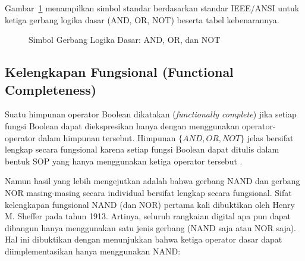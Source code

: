 Gambar~\ref{fig:gerbang-dasar} menampilkan simbol standar berdasarkan standar IEEE/ANSI untuk ketiga gerbang logika dasar (AND, OR, NOT) beserta tabel kebenarannya.

\begin{figure}[htbp]
\centering
{}
\caption{Simbol Gerbang Logika Dasar: AND, OR, dan NOT}
\label{fig:gerbang-dasar}
\end{figure}

\subsection{Kelengkapan Fungsional (Functional Completeness)}

Suatu himpunan operator Boolean dikatakan  (\textit{functionally complete}) jika setiap fungsi Boolean dapat diekspresikan hanya dengan menggunakan operator-operator dalam himpunan tersebut. Himpunan $\{AND, OR, NOT\}$ jelas bersifat lengkap secara fungsional karena setiap fungsi Boolean dapat ditulis dalam bentuk SOP yang hanya menggunakan ketiga operator tersebut \cite{rosen2019}.

Namun hasil yang lebih mengejutkan adalah bahwa gerbang NAND dan gerbang NOR masing-masing secara individual bersifat lengkap secara fungsional. Sifat kelengkapan fungsional NAND (dan NOR) pertama kali dibuktikan oleh Henry M. Sheffer pada tahun 1913. Artinya, seluruh rangkaian digital apa pun dapat dibangun hanya menggunakan satu jenis gerbang (NAND saja atau NOR saja). Hal ini dibuktikan dengan menunjukkan bahwa ketiga operator dasar dapat diimplementasikan hanya menggunakan NAND:

